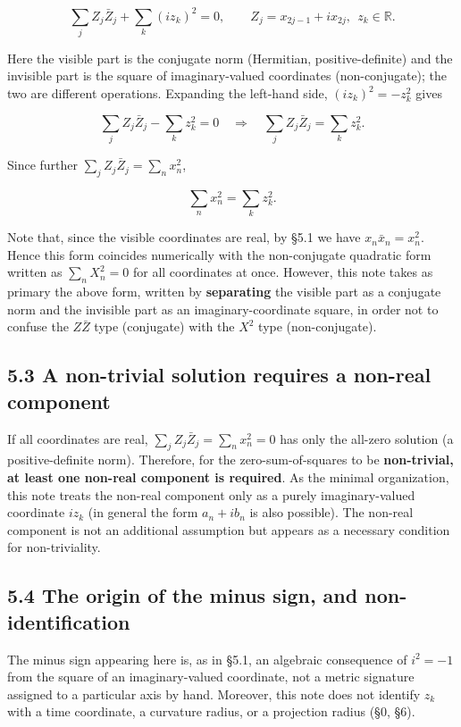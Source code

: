 \documentclass[11pt,a4paper]{article}
\begin{document}
\[
\sum_j Z_j\bar Z_j+\sum_k (i z_k)^2=0,
\qquad Z_j=x_{2j-1}+i x_{2j},\ \ z_k\in\mathbb{R}.
\]

Here the visible part is the conjugate norm (Hermitian,
positive-definite) and the invisible part is the square of
imaginary-valued coordinates (non-conjugate); the two are different
operations. Expanding the left-hand side, \((i z_k)^2=-z_k^2\) gives

\[
\sum_j Z_j\bar Z_j-\sum_k z_k^2=0
\quad\Longrightarrow\quad
\sum_j Z_j\bar Z_j=\sum_k z_k^2 .
\]

Since further \(\sum_j Z_j\bar Z_j=\sum_n x_n^2\),

\[
\sum_n x_n^2=\sum_k z_k^2 .
\]

Note that, since the visible coordinates are real, by §5.1 we have
\(x_n\bar x_n=x_n^2\). Hence this form coincides numerically with the
non-conjugate quadratic form written as \(\sum_n X_n^2=0\) for all
coordinates at once. However, this note takes as primary the above form,
written by \textbf{separating} the visible part as a conjugate norm and
the invisible part as an imaginary-coordinate square, in order not to
confuse the \(Z\bar Z\) type (conjugate) with the \(X^2\) type
(non-conjugate).

\subsection{5.3 A non-trivial solution requires a non-real
component}\label{a-non-trivial-solution-requires-a-non-real-component}

If all coordinates are real, \(\sum_j Z_j\bar Z_j=\sum_n x_n^2=0\) has
only the all-zero solution (a positive-definite norm). Therefore, for
the zero-sum-of-squares to be \textbf{non-trivial, at least one non-real
component is required}. As the minimal organization, this note treats
the non-real component only as a purely imaginary-valued coordinate
\(i z_k\) (in general the form \(a_n+i b_n\) is also possible). The
non-real component is not an additional assumption but appears as a
necessary condition for non-triviality.

\subsection{5.4 The origin of the minus sign, and
non-identification}\label{the-origin-of-the-minus-sign-and-non-identification}

The minus sign appearing here is, as in §5.1, an algebraic consequence
of \(i^2=-1\) from the square of an imaginary-valued coordinate, not a
metric signature assigned to a particular axis by hand. Moreover, this
note does not identify \(z_k\) with a time coordinate, a curvature
radius, or a projection radius (§0, §6).
\end{document}
